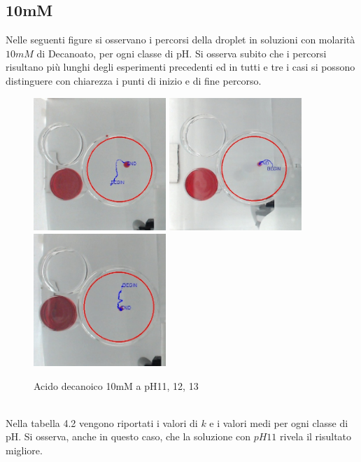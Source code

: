 \subsection{10mM}
Nelle seguenti figure si osservano i percorsi della droplet in soluzioni con molarità $10mM$ di Decanoato, per ogni classe di pH. Si osserva subito che i percorsi risultano più lunghi degli esperimenti precedenti ed in tutti e tre i casi si possono distinguere con chiarezza i punti di inizio e di fine percorso. 
\begin{figure}[h]
	\centering
   		{\includegraphics[width=5cm]{immagini/10mMph11-2.jpg}} %
 	\hspace{2mm}   	
		{\includegraphics[width=5cm]{immagini/10mMpH12-1.png}} %
	\hspace{2mm}   	
		{\includegraphics[width=5cm]{immagini/10mMpH13-2.jpg}}  %
	\caption{Acido decanoico 10mM a pH11, 12, 13}
\end{figure}
\\Nella tabella 4.2 vengono riportati i valori di $k$ e i valori medi per ogni classe di pH. Si osserva, anche in questo caso, che la soluzione con $pH11$ rivela il risultato migliore. 
